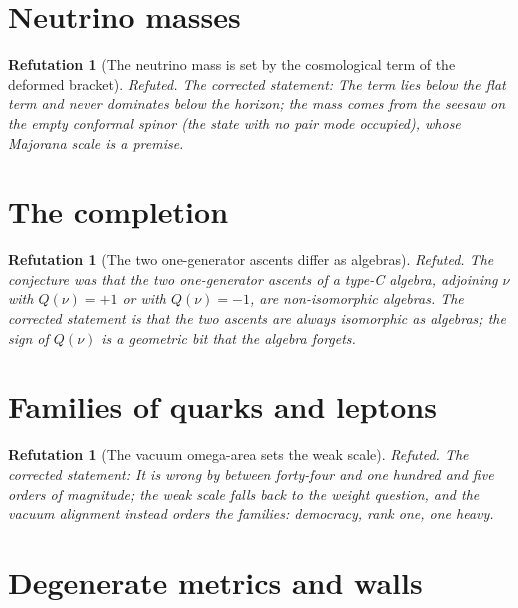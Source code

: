 \documentclass[11pt]{article}
\newtheorem{refutation}[theorem]{Refutation}
\theoremstyle{definition}
\theoremstyle{plain}
\newcommand{\changedmark}[2]{\marginpar{\raggedright\scriptsize\color{#1}#2}}
\begin{document}
\section{Neutrino masses}

\begin{refutation}[The neutrino mass is set by the cosmological term of the deformed bracket]\label{c:refuted.the-neutrino-mass-is-set-by-the-cosmological-ter}
Refuted. The corrected statement: The term lies below the flat term and never dominates below the horizon; the mass comes from the seesaw on the empty conformal spinor (the state with no pair mode occupied), whose Majorana scale is a premise.
\end{refutation}

\section{The completion}

\begin{refutation}[The two one-generator ascents differ as algebras]\label{c:refuted.the-two-one-generator-ascents-differ-as-algebras}
\changedmark{gray}{reworded}
Refuted. The conjecture was that the two one-generator ascents of a type-C algebra, adjoining $\nu$ with $Q(\nu) = +1$ or with $Q(\nu) = -1$, are non-isomorphic algebras. The corrected statement is that the two ascents are always isomorphic as algebras; the sign of $Q(\nu)$ is a geometric bit that the algebra forgets.
\end{refutation}

\section{Families of quarks and leptons}

\begin{refutation}[The vacuum omega-area sets the weak scale]\label{c:refuted.the-vacuum-omega-area-sets-the-weak-scale}
\changedmark{gray}{reworded}
Refuted. The corrected statement: It is wrong by between forty-four and one hundred and five orders of magnitude; the weak scale falls back to the weight question, and the vacuum alignment instead orders the families: democracy, rank one, one heavy.
\end{refutation}

\section{Degenerate metrics and walls}
\end{document}
